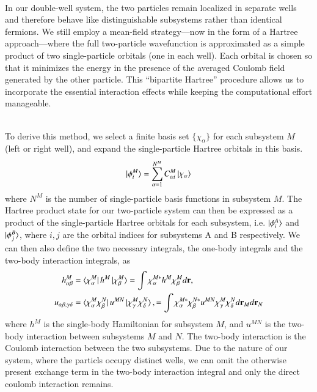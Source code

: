 \documentclass{subfiles}
\begin{document}
\\
In our double-well system, the two particles remain localized in separate wells and therefore behave like distinguishable subsystems rather than identical fermions. We still employ a mean-field strategy—now in the form of a Hartree approach—where the full two-particle wavefunction is approximated as a simple product of two single-particle orbitals (one in each well). Each orbital is chosen so that it minimizes the energy in the presence of the averaged Coulomb field generated by the other particle. This “bipartite Hartree” procedure allows us to incorporate the essential interaction effects while keeping the computational effort manageable.

\\
To derive this method, we select a finite basis set $\{\chi_\alpha\}$ for each subsystem $M$ (left or right well), and expand the single-particle Hartree orbitals in this basis. 
\begin{align*}
    \ket{\phi^M_i} = \sum_{\alpha=1}^{N^M} C^M_{\alpha i}\ket{\chi_\alpha}
\end{align*}
where $N^M$ is the number of single-particle basis functions in subsystem $M$. The Hartree product state for our two-particle system can then be expressed as a product of the single-particle Hartree orbitals for each subsystem, i.e. $\ket{\phi^A_i}$ and $\ket{\phi^B_j}$, where $i,j$ are the orbital indices for subsystems A and B respectively. We can then also define the two necessary integrals, the one-body integrals and the two-body interaction integrals, as
\begin{align*}
    h_{\alpha\beta}^M &= \bra{\chi_\alpha^M}h^M\ket{\chi_\beta^M} = \int \chi_\alpha^{M*} h^M\chi_\beta^M d\mathbf{r},\\
    u_{\alpha\beta,\gamma\delta} &= \bra{\chi_\alpha^M\chi_\beta^N}u^{MN}\ket{\chi_\gamma^M\chi_\delta^N}, = \int \chi_\alpha^{M*}\chi_\beta^{N*} u^{MN} \chi_\gamma^M\chi_\delta^N d\mathbf{r}_M d\mathbf{r}_N
\end{align*}
where $h^M$ is the single-body Hamiltonian for subsystem $M$, and $u^{MN}$ is the two-body interaction between subsystems $M$ and $N$. The two-body interaction is the Coulomb interaction between the two subsystems. Due to the nature of our system, where the particls occupy distinct wells, we can omit the otherwise present exchange term in the two-body interaction integral and only the direct coulomb interaction remains. \\
\end{document}
